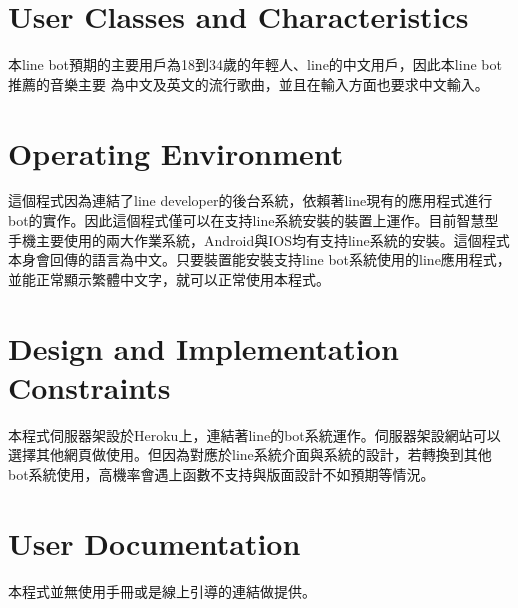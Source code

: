 \documentclass{scrreprt}
\begin{document}
\section{User Classes and Characteristics}
\begin{CJK}{UTF8}{<font>}
本line bot預期的主要用戶為18到34歲的年輕人、line的中文用戶，因此本line bot推薦的音樂主要
為中文及英文的流行歌曲，並且在輸入方面也要求中文輸入。
\end{CJK}

\section{Operating Environment}
\begin{CJK}{UTF8}{<font>}
這個程式因為連結了line developer的後台系統，依賴著line現有的應用程式進行bot的實作。因此這個程式僅可以在支持line系統安裝的裝置上運作。目前智慧型手機主要使用的兩大作業系統，Android與IOS均有支持line系統的安裝。這個程式本身會回傳的語言為中文。只要裝置能安裝支持line bot系統使用的line應用程式，並能正常顯示繁體中文字，就可以正常使用本程式。
\end{CJK}

\section{Design and Implementation Constraints}
\begin{CJK}{UTF8}{<font>}
本程式伺服器架設於Heroku上，連結著line的bot系統運作。伺服器架設網站可以選擇其他網頁做使用。但因為對應於line系統介面與系統的設計，若轉換到其他bot系統使用，高機率會遇上函數不支持與版面設計不如預期等情況。
\end{CJK}

\section{User Documentation}
\begin{CJK}{UTF8}{<font>}
本程式並無使用手冊或是線上引導的連結做提供。
\end{CJK}
\end{document}
